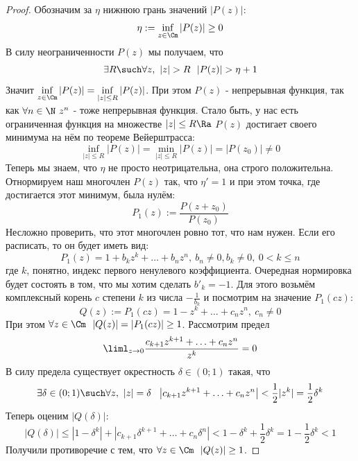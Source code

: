 \begin{proof}
	Обозначим за $\eta$ нижнюю грань значений $|P(z)|$:
	\[
		\eta := \inf\limits_{z \in \Cm} |P(z)| \ge 0
	\]
	В силу неограниченности $P(z)$ мы получаем, что
	\[
		\exists R \such \forall z,\ |z| > R\ \ |P(z)| > \eta + 1
	\]
	Значит $\inf\limits_{z \in \Cm} |P(z)| = \inf\limits_{|z| \le R} |P(z)|$. При этом $P(z)$ - непрерывная функция, так как $\forall n \in \N\ z^n$ - тоже непрерывная функция. Стало быть, у нас есть ограниченная функция на множестве $|z| \le R \Ra $ $P(z)$ достигает своего минимума на нём по теореме Вейерштрасса: 
	\[
		\inf\limits_{|z| \le R} |P(z)| = \min\limits_{|z| \le R} |P(z)| = |P(z_0)| \neq 0
	\]
	Теперь мы знаем, что $\eta$ не просто неотрицательна, она строго положительна. Отнормируем наш многочлен $P(z)$ так, что $\eta' = 1$ и при этом точка, где достигается этот минимум, была нулём:
	\[
		P_1(z) := \frac{P(z + z_0)}{P(z_0)}
	\]
	Несложно проверить, что этот многочлен ровно тот, что нам нужен. Если его расписать, то он будет иметь вид:
	\[
		P_1(z) = 1 + b_k z^k + \ldots + b_n z^n,\ b_n \neq 0, b_k \neq 0,\ 0 < k \le n 
	\]
	где $k$, понятно, индекс первого ненулевого коэффициента. Очередная нормировка будет состоять в том, что мы хотим сделать $b'_k = -1$. Для этого возьмём комплексный корень $c$ степени $k$ из числа $-\frac{1}{b_k}$ и посмотрим на значение $P_1(cz)$:
	\[
		Q(z) := P_1(cz) = 1 - z^k + \ldots + c_n z^n,\ c_n \neq 0
	\]
	При этом $\forall z \in \Cm\ \ |Q(z)| = |P_1(cz)| \ge 1$. Рассмотрим предел
	\[
		\liml_{z \to 0} \frac{c_{k + 1} z^{k + 1} + \ldots + c_n z^n}{z^k} = 0
	\]
	В силу предела существует окрестность $\delta \in (0; 1)$ такая, что
	\[
		\exists \delta \in (0; 1) \such \forall z,\ |z| = \delta\ \ \left|c_{k + 1}z^{k + 1} + \ldots + c_n z^n\right| < \frac{1}{2}|z^k| = \frac{1}{2}\delta^k
	\]
	Теперь оценим $|Q(\delta)|$:
	\[
		|Q(\delta)| \le |1 - \delta^k| + |c_{k + 1}\delta^{k + 1} + \ldots + c_n \delta^n| < 1 - \delta^k + \frac{1}{2}\delta^k = 1 - \frac{1}{2}\delta^k < 1
	\]
	Получили противоречие с тем, что $\forall z \in \Cm\ \ |Q(z)| \ge 1$.
\end{proof}